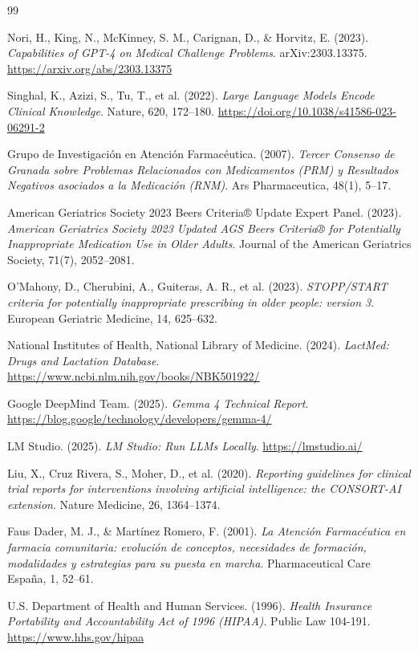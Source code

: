 \documentclass[12pt,a4paper]{article}
\begin{document}
\begin{thebibliography}{99}

Nori, H., King, N., McKinney, S. M., Carignan, D., \& Horvitz, E. (2023).
\textit{Capabilities of GPT-4 on Medical Challenge Problems}.
arXiv:2303.13375. \url{https://arxiv.org/abs/2303.13375}

Singhal, K., Azizi, S., Tu, T., et al. (2022).
\textit{Large Language Models Encode Clinical Knowledge}.
Nature, 620, 172--180. \url{https://doi.org/10.1038/s41586-023-06291-2}

Grupo de Investigación en Atención Farmacéutica. (2007).
\textit{Tercer Consenso de Granada sobre Problemas Relacionados con Medicamentos (PRM) y
Resultados Negativos asociados a la Medicación (RNM)}.
Ars Pharmaceutica, 48(1), 5--17.

American Geriatrics Society 2023 Beers Criteria® Update Expert Panel. (2023).
\textit{American Geriatrics Society 2023 Updated AGS Beers Criteria® for Potentially Inappropriate
Medication Use in Older Adults}.
Journal of the American Geriatrics Society, 71(7), 2052--2081.

O'Mahony, D., Cherubini, A., Guiteras, A. R., et al. (2023).
\textit{STOPP/START criteria for potentially inappropriate prescribing in older people: version 3}.
European Geriatric Medicine, 14, 625--632.

National Institutes of Health, National Library of Medicine. (2024).
\textit{LactMed: Drugs and Lactation Database}.
\url{https://www.ncbi.nlm.nih.gov/books/NBK501922/}

Google DeepMind Team. (2025).
\textit{Gemma 4 Technical Report}.
\url{https://blog.google/technology/developers/gemma-4/}

LM Studio. (2025).
\textit{LM Studio: Run LLMs Locally}.
\url{https://lmstudio.ai/}

Liu, X., Cruz Rivera, S., Moher, D., et al. (2020).
\textit{Reporting guidelines for clinical trial reports for interventions involving artificial
intelligence: the CONSORT-AI extension}.
Nature Medicine, 26, 1364--1374.

Faus Dader, M. J., \& Martínez Romero, F. (2001).
\textit{La Atención Farmacéutica en farmacia comunitaria: evolución de conceptos, necesidades de
formación, modalidades y estrategias para su puesta en marcha}.
Pharmaceutical Care España, 1, 52--61.

U.S. Department of Health and Human Services. (1996).
\textit{Health Insurance Portability and Accountability Act of 1996 (HIPAA)}.
Public Law 104-191. \url{https://www.hhs.gov/hipaa}

\end{thebibliography}
\end{document}
